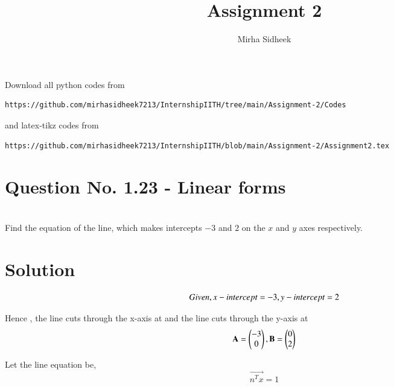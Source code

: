 \documentclass[journal,12pt,twocolumn]{IEEEtran}
\begin{document}
     \def\centbox#1{\makebox[0in]{#1}}
     \def\topbox#1{\raisebox{-\baselineskip}[0in][0in]{#1}}
     \def\midbox#1{\raisebox{-0.5\baselineskip}[0in][0in]{#1}}
\vspace{3cm}
\title{Assignment 2}
\author{Mirha Sidheek}
\maketitle
\newpage
\bigskip
\renewcommand{\thefigure}{\theenumi}
\renewcommand{\thetable}{\theenumi}
Download all python codes from 
\begin{lstlisting}
https://github.com/mirhasidheek7213/InternshipIITH/tree/main/Assignment-2/Codes
\end{lstlisting}

%
and latex-tikz codes from 
%
\begin{lstlisting}
https://github.com/mirhasidheek7213/InternshipIITH/blob/main/Assignment-2/Assignment2.tex
\end{lstlisting}

\section{Question No. 1.23 - Linear forms}\\

 Find the equation of the line, which makes intercepts $-3$ and $2$ on the $x$ and $y$ axes respectively.
%
\section{Solution}
\begin{equation}
Given, x-intercept=-3, y-intercept = 2\\
\end{equation}

Hence , the line cuts through the x-axis at  and the line cuts through the y-axis at \\
\begin{equation}
\mathbf{A} = {\begin{pmatrix}-3\\0\end{pmatrix} , \mathbf{B} = \begin{pmatrix}0\\2\end{pmatrix}}
\end{equation}



Let the line equation be,
\begin{equation}
    \vec{n^Tx}=1
\end{equation}
\end{document}

